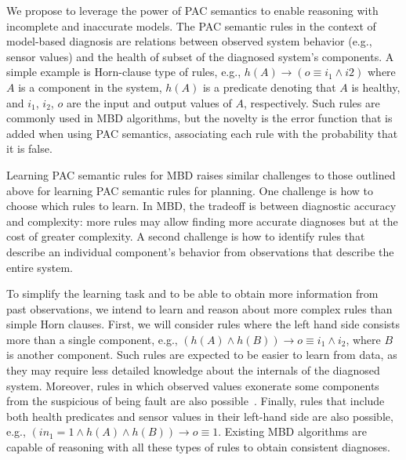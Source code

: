 \documentclass[12pt]{article}
\newcommand{\note}[1]{\textbf{\textit{#1}}}
\begin{document}
We propose to leverage the power of PAC semantics to enable reasoning with incomplete and inaccurate models. The PAC semantic rules in the context of model-based diagnosis are relations between observed system behavior (e.g., sensor values) and the health of subset of the diagnosed system's components. 
A simple example is Horn-clause type of rules, e.g., $h(A)\rightarrow (o\equiv i_1 \wedge i2)$
where $A$ is a component in the system, $h(A)$ is a predicate denoting that $A$ is healthy, and $i_1$, $i_2$, $o$ are the input and output values of $A$, respectively. 
Such rules are commonly used in MBD algorithms, but the novelty is the error function that is added when using PAC semantics, associating each rule with the probability that it is false. 


Learning PAC semantic rules for MBD raises similar challenges to those outlined above for learning PAC semantic rules for planning. 
One challenge is how to choose which rules to learn. In MBD, the tradeoff is between  diagnostic accuracy and complexity: more rules may allow finding more accurate diagnoses but at the cost of greater complexity. 
A second challenge is how to identify rules that describe an individual component's behavior from observations that describe the entire system. 






To simplify the learning task and to be able to obtain more information from past observations, we intend to learn and reason about more complex rules than simple Horn clauses. First, we will consider rules where the left hand side consists more than a single component,  e.g., $(h(A)\wedge h(B)) \rightarrow o\equiv i_1\wedge i_2$, where $B$ is another component. Such rules are expected to be easier to learn from data, as they may require less detailed knowledge about the internals of the diagnosed system. Moreover, rules in which observed values exonerate some components from the suspicious of being fault are also possible~\cite{struss1989physical}. 
Finally, rules that include both health predicates and sensor values in their left-hand side are also possible, e.g., 
$(in_1=1 \wedge h(A) \wedge h(B))\rightarrow o\equiv 1$. Existing MBD algorithms are capable of reasoning with all these types of rules to obtain consistent diagnoses. 
\end{document}
